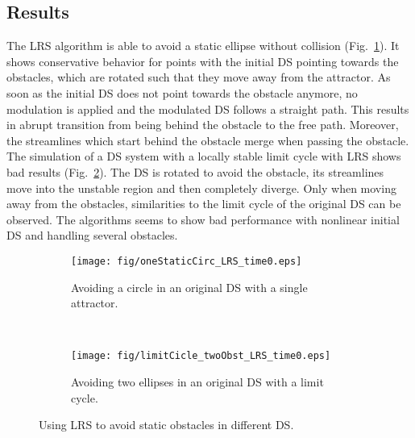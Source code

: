 \subsection{Results}
The LRS algorithm is able to avoid a static ellipse without collision (Fig.~\ref{fig:oneStaticCirc_LRS}). It shows conservative behavior for points with the initial DS pointing towards the obstacles, which are rotated  such that they move away from the attractor. As soon as the initial DS does not point towards the obstacle anymore, no modulation is applied and the modulated DS follows a straight path. This results in abrupt transition from being behind the obstacle to the free path. Moreover, the streamlines which start behind the obstacle merge when passing the obstacle.
The simulation of a DS system with a locally stable limit cycle with LRS shows bad results (Fig.~\ref{fig:limitCicle_twoObst_LRS_time0}). The DS is rotated to avoid the obstacle, its streamlines move into the unstable region and then completely diverge. Only when moving away from the obstacles, similarities to the limit cycle of the original DS can be observed. The algorithms seems to show bad performance with nonlinear initial DS and handling several obstacles.
\begin{figure}[tb]\centering
\begin{subfigure}{.48\columnwidth} %
\centering
\texttt{[image: fig/oneStaticCirc\_LRS\_time0.eps]}
\caption{Avoiding a circle in an original DS with a single attractor.}
\label{fig:oneStaticCirc_LRS}
\end{subfigure}\,\, %
\begin{subfigure}{.48\columnwidth} %
\centering
\texttt{[image: fig/limitCicle\_twoObst\_LRS\_time0.eps]}
\caption{Avoiding two ellipses in an original DS with a limit cycle.}
\label{fig:limitCicle_twoObst_LRS_time0}
\end{subfigure}
\caption{Using LRS to avoid static obstacles in different DS.}
\label{fig:static_LRS}
\end{figure}

